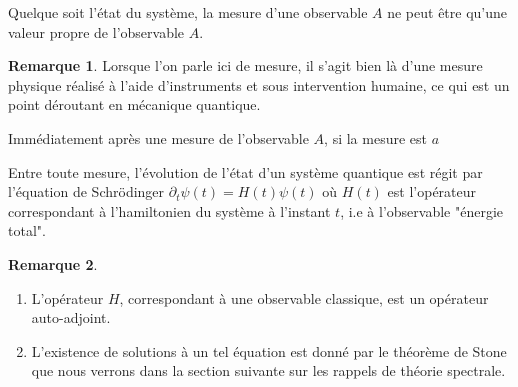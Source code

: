 \documentclass[12pt,openany,a4paper, titlepage]{article}
\theoremstyle{definition}
\theoremstyle{definition}
\theoremstyle{definition}
\theoremstyle{definition}
\theoremstyle{definition}
\newtheorem{rem}{Remarque}
\theoremstyle{definition}
\begin{document}
\vspace{3mm}
\begin{tcolorbox}[colback=gray!5!white,
                  colframe=gray!80!white,
                  title= Postulat 3 : Principe de quantification ]
Quelque soit l'état du système, la mesure d'une observable $A$ ne peut être qu'une valeur propre de l'observable $A$.
\end{tcolorbox}
\vspace{3mm}

\begin{rem}
    Lorsque l'on parle ici de mesure, il s'agit bien là d'une mesure physique réalisé à l'aide d'instruments et sous intervention humaine, ce qui est un point déroutant en mécanique quantique. 
\end{rem}


\vspace{3mm}
\begin{tcolorbox}[colback=gray!5!white,
                  colframe=gray!80!white,
                  title= Postulat 4 : Principe de décomposition spectrale ]

\end{tcolorbox}
\vspace{3mm}

\vspace{3mm}
\begin{tcolorbox}[colback=gray!5!white,
                  colframe=gray!80!white,
                  title= Postulat 5 : Principe de réduction du paquet d’onde ]
Immédiatement après une mesure de l'observable $A$, si la mesure est $a$
\end{tcolorbox}
\vspace{3mm}

\vspace{3mm}
\begin{tcolorbox}[colback=gray!5!white,
                  colframe=gray!80!white,
                  title= Postulat 6 : Evolution d'un système dans le temps ]
Entre toute mesure, l'évolution de l'état d'un système quantique est régit par l'équation de Schrödinger 
$\partial_t \psi(t) = H(t)\psi(t)$
où $H(t)$ est l'opérateur correspondant à l'hamiltonien du système à l'instant $t$, i.e à l'observable "énergie total".
\end{tcolorbox}
\vspace{3mm}

\begin{rem}
    \begin{enumerate}
        \item[1] L'opérateur $H$, correspondant à une observable classique, est un opérateur auto-adjoint.
        \item[2] L'existence de solutions à un tel équation est donné par le théorème de Stone que nous verrons dans la section suivante sur les rappels de théorie spectrale.
    \end{enumerate}
\end{rem}
\end{document}

